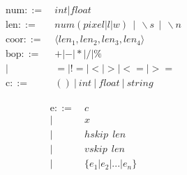 \begin{figure*}[!ht]
\begin{minipage}{0.8\columnwidth}
\begin{align*}
\text{num} ::=~& int|float\\
\text{len} ::=~& num  (pixel|l|w) ~~ | ~~ \backslash s ~~ | ~~ \backslash n\\
\text{coor} ::=~& \langle len_1, len_2, len_3, len_4\rangle\\
\text{bop} ::=
~& +|-|*|/|\%\\
|~&=|!=|<|>|<=|>=\\
\text{c} ::=~& ()~ |~ int~ |~ float~ |~ string \\
\end{align*}
\end{minipage}
\begin{minipage}{0.8\columnwidth}
\begin{align*}
\text{e} ::=
~& c \tag{constant}\label{syntax:constant}\\
|~& x \tag{variable}\label{syntax:name}\\
|~& hskip ~~len \tag{horizontal skip}\label{syntax:hskip}\\
|~& vskip ~~len \tag{vertical skip}\label{syntax:vskip}\\
|~& \{e_1 | e_2 | ... | e_n\} \tag{union}\label{syntax:union}\\

\end{align*}
\end{minipage}
\end{figure*}
